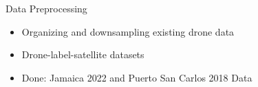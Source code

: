 




\begin{frame}{Data Preprocessing}
    \begin{itemize}
        \item Organizing and downsampling existing drone data
        \item Drone-label-satellite datasets
        \item Done: Jamaica 2022 and Puerto San Carlos 2018 Data
    \end{itemize}    
\end{frame}

